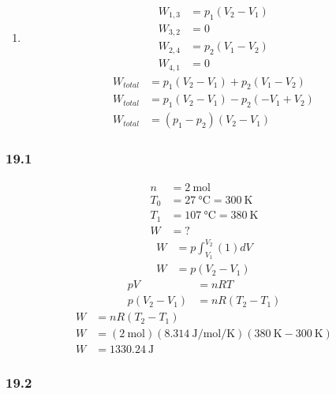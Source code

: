 \documentclass{article}
\begin{document}
\begin{enumerate}[label = \textbf{(\alph*)}]
	\item
		\begin{align*}
			W_{1,3} & = p_1(V_2 - V_1) \\
			W_{3,2} & = 0 \\
			W_{2,4} & = p_2(V_1 - V_2) \\
			W_{4,1} & = 0
		\end{align*}
		\begin{align*}
			W_{total} & = p_1(V_2 - V_1) + p_2(V_1 - V_2) \\
			W_{total} & = p_1(V_2 - V_1) - p_2(-V_1 + V_2) \\
			W_{total} & = (p_1 - p_2)(V_2 - V_1)
		\end{align*}
\end{enumerate}

\subsubsection{19.1}

\begin{align*}
	n & = \SI{2}{\mole} \\
	T_0 & = \SI{27}{\celsius} = \SI{300}{\kelvin} \\
	T_1 & = \SI{107}{\celsius} = \SI{380}{\kelvin} \\
	W & = ?
\end{align*}
\begin{align*}
	W & = p \int_{V_1}^{V_2} (1) dV \\
	W & = p(V_2 - V_1)
\end{align*}
\begin{align*}
	pV & = nRT \\
	p(V_2 - V_1) & = nR(T_2 - T_1)
\end{align*}
\begin{align*}
	W & = nR(T_2 - T_1) \\
	W & = (\SI{2}{\mole})(\SI{8.314}{\joule \per \mole \per \kelvin})(\SI{380}{\kelvin} - \SI{300}{\kelvin}) \\
	W & = \SI{1330.24}{\joule}
\end{align*}

\subsubsection{19.2}
\end{document}
